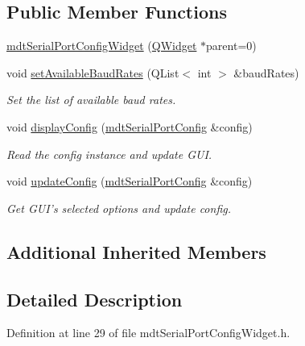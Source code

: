 \subsection*{Public Member Functions}
\begin{DoxyCompactItemize}
\item 
\hyperlink{classmdt_serial_port_config_widget_a7c6dc14693263f011e0725d45040b0f3}{mdt\-Serial\-Port\-Config\-Widget} (\hyperlink{class_q_widget}{Q\-Widget} $\ast$parent=0)
\item 
void \hyperlink{classmdt_serial_port_config_widget_a5113611573e0e8cc0fd030e887e17c86}{set\-Available\-Baud\-Rates} (Q\-List$<$ int $>$ \&baud\-Rates)
\begin{DoxyCompactList}\small\item\em Set the list of available baud rates. \end{DoxyCompactList}\item 
void \hyperlink{classmdt_serial_port_config_widget_a3cc8a728e224b656510896f31047fb73}{display\-Config} (\hyperlink{classmdt_serial_port_config}{mdt\-Serial\-Port\-Config} \&config)
\begin{DoxyCompactList}\small\item\em Read the config instance and update G\-U\-I. \end{DoxyCompactList}\item 
void \hyperlink{classmdt_serial_port_config_widget_aebc1fba656f51f9910a466add7987fcf}{update\-Config} (\hyperlink{classmdt_serial_port_config}{mdt\-Serial\-Port\-Config} \&config)
\begin{DoxyCompactList}\small\item\em Get G\-U\-I's selected options and update config. \end{DoxyCompactList}\end{DoxyCompactItemize}
\subsection*{Additional Inherited Members}


\subsection{Detailed Description}


Definition at line 29 of file mdt\-Serial\-Port\-Config\-Widget.\-h.



